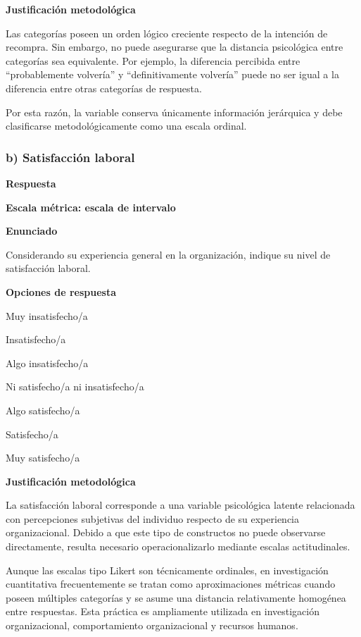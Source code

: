 \documentclass[12pt,letterpaper]{article}
\begin{document}
\textbf{Justificación metodológica}

Las categorías poseen un orden lógico creciente respecto de la intención de recompra. Sin embargo, no puede asegurarse que la distancia psicológica entre categorías sea equivalente. Por ejemplo, la diferencia percibida entre ``probablemente volvería'' y ``definitivamente volvería'' puede no ser igual a la diferencia entre otras categorías de respuesta.

Por esta razón, la variable conserva únicamente información jerárquica y debe clasificarse metodológicamente como una escala ordinal.

\subsubsection*{b) Satisfacción laboral}

\textbf{Respuesta}

\textbf{Escala métrica: escala de intervalo}

\textbf{Enunciado}

Considerando su experiencia general en la organización, indique su nivel de satisfacción laboral.

\textbf{Opciones de respuesta}

\begin{opciones}
\item Muy insatisfecho/a
\item Insatisfecho/a
\item Algo insatisfecho/a
\item Ni satisfecho/a ni insatisfecho/a
\item Algo satisfecho/a
\item Satisfecho/a
\item Muy satisfecho/a
\end{opciones}

\textbf{Justificación metodológica}

La satisfacción laboral corresponde a una variable psicológica latente relacionada con percepciones subjetivas del individuo respecto de su experiencia organizacional. Debido a que este tipo de constructos no puede observarse directamente, resulta necesario operacionalizarlo mediante escalas actitudinales.

Aunque las escalas tipo Likert son técnicamente ordinales, en investigación cuantitativa frecuentemente se tratan como aproximaciones métricas cuando poseen múltiples categorías y se asume una distancia relativamente homogénea entre respuestas. Esta práctica es ampliamente utilizada en investigación organizacional, comportamiento organizacional y recursos humanos.
\end{document}
